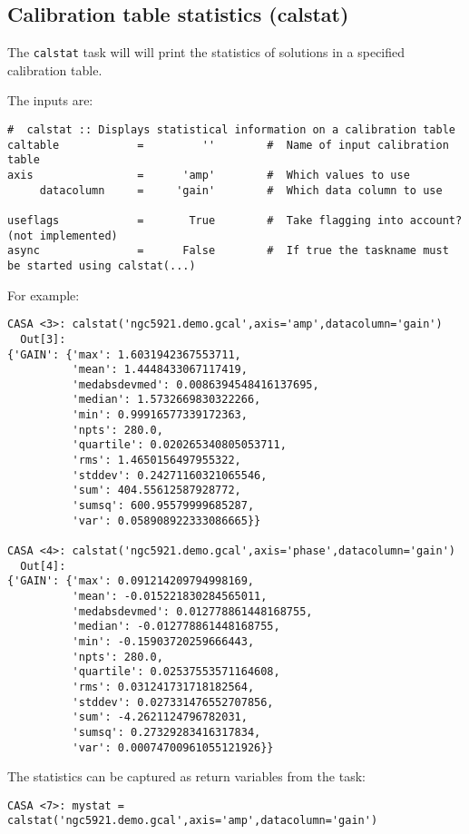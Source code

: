 {\begin{verbatim}
\end{verbatim}
\normalsize

\subsection{Calibration table statistics ({\rm calstat})}
\label{section:cal.tables.calstat}

The {\tt calstat} task will will print the statistics of solutions in a specified 
calibration table.

The inputs are:
\small
\begin{verbatim}
#  calstat :: Displays statistical information on a calibration table
caltable            =         ''        #  Name of input calibration table
axis                =      'amp'        #  Which values to use
     datacolumn     =     'gain'        #  Which data column to use

useflags            =       True        #  Take flagging into account? (not implemented)
async               =      False        #  If true the taskname must be started using calstat(...)
\end{verbatim}
\normalsize

For example:
\small
\begin{verbatim}
CASA <3>: calstat('ngc5921.demo.gcal',axis='amp',datacolumn='gain')
  Out[3]: 
{'GAIN': {'max': 1.6031942367553711,
          'mean': 1.4448433067117419,
          'medabsdevmed': 0.0086394548416137695,
          'median': 1.5732669830322266,
          'min': 0.99916577339172363,
          'npts': 280.0,
          'quartile': 0.020265340805053711,
          'rms': 1.4650156497955322,
          'stddev': 0.24271160321065546,
          'sum': 404.55612587928772,
          'sumsq': 600.95579999685287,
          'var': 0.058908922333086665}}

CASA <4>: calstat('ngc5921.demo.gcal',axis='phase',datacolumn='gain')
  Out[4]: 
{'GAIN': {'max': 0.091214209794998169,
          'mean': -0.015221830284565011,
          'medabsdevmed': 0.012778861448168755,
          'median': -0.012778861448168755,
          'min': -0.15903720259666443,
          'npts': 280.0,
          'quartile': 0.02537553571164608,
          'rms': 0.031241731718182564,
          'stddev': 0.027331476552707856,
          'sum': -4.2621124796782031,
          'sumsq': 0.27329283416317834,
          'var': 0.00074700961055121926}}
\end{verbatim}
\normalsize
The statistics can be captured as return variables from the task:
\small
\begin{verbatim}
CASA <7>: mystat = calstat('ngc5921.demo.gcal',axis='amp',datacolumn='gain')


\end{verbatim}}
